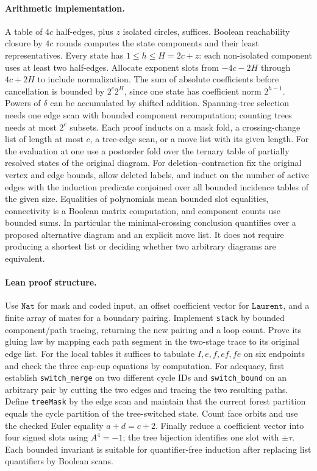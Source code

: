 \paragraph{Arithmetic implementation.}
A table of $4c$ half-edges, plus $z$ isolated circles, suffices. Boolean
reachability closure by $4c$ rounds computes the state components and
their least representatives. Every state has $1\le h\le H=2c+z$:
each non-isolated component uses at least two half-edges.
Allocate exponent slots from $-4c-2H$ through $4c+2H$ to include
normalization. The sum of absolute coefficients before cancellation is
bounded by $2^c 2^{H}$, since one state has coefficient norm
$2^{h-1}$. Powers of $\delta$ can be accumulated by shifted addition.
Spanning-tree selection needs one edge scan with bounded component
recomputation; counting trees needs at most $2^c$ subsets. Each proof
inducts on a mask fold, a crossing-change list of length at most $c$, a
tree-edge scan, or a move list with its given length. For the evaluation at one use a postorder fold over the ternary table of partially resolved states of the original diagram. For deletion--contraction fix the original vertex and edge bounds, allow deleted labels, and induct on the number of active edges with the induction predicate conjoined over all bounded incidence tables of the given size. Equalities of
polynomials mean bounded slot equalities, connectivity is a Boolean
matrix computation, and component counts use bounded sums. In particular
the minimal-crossing conclusion quantifies over a proposed alternative
diagram and an explicit move list. It does not require producing a
shortest list or deciding whether two arbitrary diagrams are equivalent.

\paragraph{Lean proof structure.}
Use $\mathtt{Nat}$ for mask and coded input, an offset coefficient vector for
$\mathtt{Laurent}$, and a finite array of mates for a boundary pairing.
Implement \texttt{stack} by bounded component/path tracing, returning
the new pairing and a loop count. Prove its gluing law by mapping each
path segment in the two-stage trace to its original edge list. For the
local tables it suffices to tabulate $I,e,f,ef,fe$ on six endpoints
and check the three cap-cup equations by computation. For adequacy,
first establish \texttt{switch\_merge} on two different cycle IDs and
\texttt{switch\_bound} on an arbitrary pair by cutting the two edges
and tracing the two resulting paths. Define \texttt{treeMask} by the
edge scan and maintain that the current forest partition equals
the cycle partition of the tree-switched state. Count face orbits and
use the checked Euler equality $a+d=c+2$. Finally reduce a
coefficient vector into four signed slots using $A^4=-1$; the tree
bijection identifies one slot with $\pm\tau$. Each bounded invariant is
suitable for quantifier-free induction after replacing list quantifiers
by Boolean scans.

